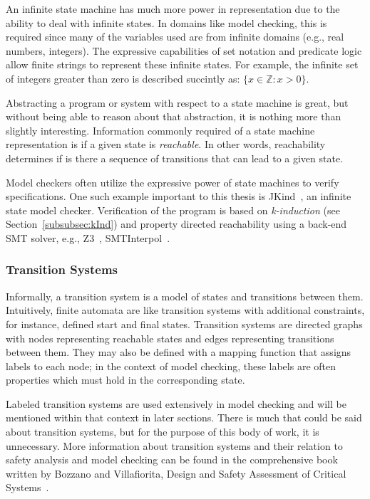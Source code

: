An infinite state machine has much more power in representation due to the ability to deal with infinite states. In domains like model checking, this is required since many of the variables used are from infinite domains (e.g., real numbers, integers). The expressive capabilities of set notation and predicate logic allow finite strings to represent these infinite states. For example, the infinite set of integers greater than zero is described succintly as: $\{x \in \mathbb{Z} : x > 0\}$. 

Abstracting a program or system with respect to a state machine is great, but without being able to reason about that abstraction, it is nothing more than slightly interesting. Information commonly required of a state machine representation is if a given state is {\em reachable}. In other words, reachability determines if is there a sequence of transitions that can lead to a given state. 

Model checkers often utilize the expressive power of state machines to verify specifications. One such example important to this thesis is JKind~\cite{2017arXiv171201222G}, an infinite state model checker. Verification of the program is based on {\em k-induction} (see Section~\ref{subsubsec:kInd}) and property directed reachability using a back-end SMT solver, e.g., Z3~\cite{z3}, SMTInterpol~\cite{smtInterpol}.

\subsubsection{Transition Systems}
Informally, a transition system is a model of states and transitions between them. Intuitively, finite automata are like transition systems with additional constraints, for instance, defined start and final states. Transition systems are directed graphs with nodes representing reachable states and edges representing transitions between them. They may also be defined with a mapping function that assigns labels to each node; in the context of model checking, these labels are often properties which must hold in the corresponding state.

Labeled transition systems are used extensively in model checking and will be mentioned within that context in later sections. There is much that could be said about transition systems, but for the purpose of this body of work, it is unnecessary. More information about transition systems and their relation to safety analysis and model checking can be found in the comprehensive book written by Bozzano and Villafiorita, Design and Safety Assessment of Critical Systems~\cite{Bozzano:2010:DSA:1951720}.

